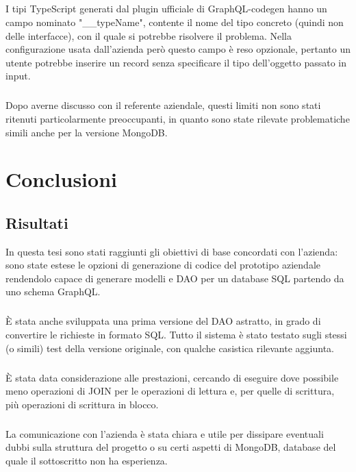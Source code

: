 \documentclass[a4paper, 12pt]{report}
\begin{document}
        \paragraph*{}
        I tipi TypeScript generati dal plugin ufficiale di GraphQL-codegen hanno un campo nominato "__typeName", contente il nome del tipo concreto (quindi non delle interfacce), con il quale si potrebbe risolvere il problema.
        Nella configurazione usata dall'azienda però questo campo è reso opzionale, pertanto un utente potrebbe inserire un record senza specificare il tipo dell'oggetto passato in input.
        \paragraph*{}
        Dopo averne discusso con il referente aziendale, questi limiti non sono stati ritenuti particolarmente preoccupanti, in quanto sono state rilevate problematiche simili anche per la versione MongoDB.
    \newpage
    \chapter{Conclusioni}
      \section*{Risultati}
      In questa tesi sono stati raggiunti gli obiettivi di base concordati con l'azienda: sono state estese le opzioni di generazione di codice del prototipo aziendale rendendolo capace di generare modelli e DAO per un database SQL partendo da uno schema GraphQL.
      \paragraph*{}
      È stata anche sviluppata una prima versione del DAO astratto, in grado di convertire le richieste in formato SQL.
      Tutto il sistema è stato testato sugli stessi (o simili) test della versione originale, con qualche casistica rilevante aggiunta.
      \paragraph*{}
        È stata data considerazione alle prestazioni, cercando di eseguire dove possibile meno operazioni di JOIN per le operazioni di lettura e, per quelle di scrittura, più operazioni di scrittura in blocco.
      \paragraph*{}
        La comunicazione con l'azienda è stata chiara e utile per dissipare eventuali dubbi sulla struttura del progetto o su certi aspetti di MongoDB, database del quale il sottoscritto non ha esperienza.
\end{document}
